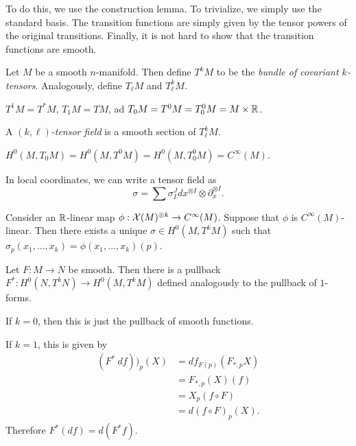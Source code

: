 \documentclass[twoside, 10pt]{article}
\begin{document}
    To do this, we use the construction lemma. To trivialize, we simply use the
    standard basis. The transition functions are simply given by the tensor
    powers of the original transitions. Finally, it is not hard to show that
    the transition functions are smooth.

    \begin{defn} Let $M$ be a smooth $n$-manifold. Then define $T^kM$ to be the
    \textit{bundle of covariant $k$-tensors}. Analogously, define $T_{\ell} M$
and $T_{\ell}^kM$.  \end{defn}

    \begin{rmk} $T^1M = T^*M$, $T_1M = TM$, ad $T_0M = T^0M = T_0^0M = M \times
    \mathbb{R}$.  \end{rmk}

    \begin{defn} A \textit{$(k,\ell)$-tensor field} is a smooth section of
    $T_{\ell}^k M$.  \end{defn}

    \begin{exm} $H^0(M, T_0M) = H^0(M, T^0M) = H^0(M, T_0^0M) = C^{\infty}(M)$.
    \end{exm}

    In local coordinates, we can write a tensor field as \[ \sigma = \sum
    \sigma^{J}_I dx^{\otimes I} \otimes \partial_x^{\otimes I}.\]

    \begin{prop} Consider an $\mathbb{R}$-linear map $\phi: \mathcal{X}(M)^{\otimes k} \to
        C^{\infty}(M)$. Suppose that $\phi$ is $C^{\infty}(M)$-linear. Then
        there exists a unique $\sigma \in H^0(M, T^kM)$ such that
        $\sigma_p(x_1, \ldots, x_k) = \phi(x_1, \ldots, x_k)(p)$.  \end{prop}

    \begin{defn} Let $F:M \to N$ be smooth. Then there is a pullback $F^*:
    H^0(N, T^kN) \to H^0(M, T^kM)$ defined analogously to the pullback of
$1$-forms.  \end{defn}

    \begin{rmk} If $k = 0$, then this is just the pullback of smooth functions.

        If $k = 1$, this is given by \begin{align*} (F^*\ df))_p(X) &=
        df_{F(p)}(F_{*,p}X) \\ &= F_{*,p}(X)(f) \\ &= X_p(f \circ F) \\ &= d(f
    \circ F)_p(X).  \end{align*} Therefore $F^*(df) = d(F^*f)$.  \end{rmk}
\end{document}
